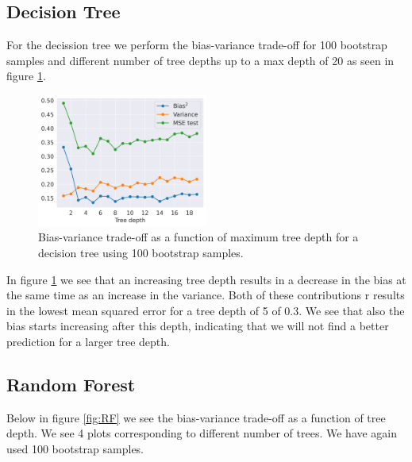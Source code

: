 \documentclass[11pt]{article}
\begin{document}
\subsection*{Decision Tree}
For the decission tree we perform the bias-variance trade-off for 100 bootstrap samples and different number of tree depths up to a max depth of 20 as seen in figure \ref{fig:DT}.
\begin{figure}[H]
    \centering
    \includegraphics[width=0.5\textwidth]{figures/tradeoff_DT.png}
    \caption{Bias-variance trade-off as a function of maximum tree depth for a decision tree using 100 bootstrap samples.}
    \label{fig:DT}
\end{figure}
In figure \ref{fig:DT} we see that an increasing tree depth results in a decrease in the bias at the same time as an increase in the variance. Both of these contributions r results in the lowest mean squared error for a tree depth of 5 of 0.3. We see that also the bias starts increasing after this depth, indicating that we will not find a better prediction for a larger tree depth.
\subsection*{Random Forest}
Below in figure \ref{fig:RF} we see the bias-variance trade-off as a function of tree depth. We see 4 plots corresponding to different number of trees. We have again used 100 bootstrap samples.
\end{document}
